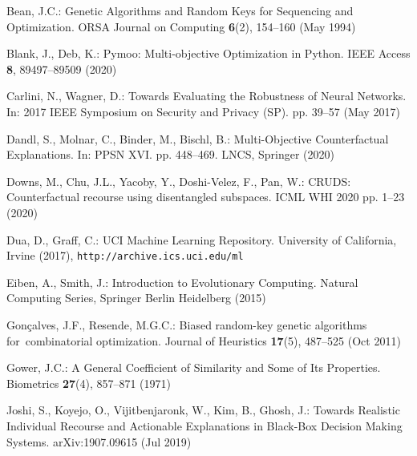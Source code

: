 \documentclass[runningheads, envcountsame, a4paper]{llncs}
\begin{document}
\begin{thebibliography}{10}
\providecommand{\url}[1]{\texttt{#1}}
\providecommand{\urlprefix}{URL }
\providecommand{\doi}[1]{https://doi.org/#1}

Bean, J.C.: Genetic {{Algorithms}} and {{Random Keys}} for {{Sequencing}} and
  {{Optimization}}. {ORSA} Journal on Computing  \textbf{6}(2),  154--160 (May
  1994)

Blank, J., Deb, K.: Pymoo: {{Multi}}-objective {{Optimization}} in {{Python}}.
  IEEE Access  \textbf{8},  89497--89509 (2020)

Carlini, N., Wagner, D.: Towards {{Evaluating}} the {{Robustness}} of {{Neural
  Networks}}. In: 2017 {{IEEE Symposium}} on {{Security}} and {{Privacy}}
  ({{SP}}). pp. 39--57 (May 2017)

Dandl, S., Molnar, C., Binder, M., Bischl, B.: Multi-{{Objective Counterfactual
  Explanations}}. In: {PPSN XVI}. pp. 448--469. {LNCS}, {Springer} (2020)

Downs, M., Chu, J.L., Yacoby, Y., {Doshi-Velez}, F., Pan, W.: {{CRUDS}}:
  {{Counterfactual}} recourse using disentangled subspaces. ICML WHI 2020 pp.
  1--23 (2020)

Dua, D., Graff, C.: {{UCI Machine Learning Repository}}. University of
  California, Irvine (2017), \url{http://archive.ics.uci.edu/ml}

Eiben, A., Smith, J.: Introduction to {{Evolutionary Computing}}. Natural
  {{Computing Series}}, {Springer Berlin Heidelberg} (2015)

Gon{\c c}alves, J.F., Resende, M.G.C.: Biased random-key genetic algorithms
  for~combinatorial optimization. Journal of Heuristics  \textbf{17}(5),
  487--525 (Oct 2011)

Gower, J.C.: A {{General Coefficient}} of {{Similarity}} and {{Some}} of {{Its
  Properties}}. Biometrics  \textbf{27}(4),  857--871 (1971)

Joshi, S., Koyejo, O., Vijitbenjaronk, W., Kim, B., Ghosh, J.: Towards
  {{Realistic Individual Recourse}} and {{Actionable Explanations}} in
  {{Black}}-{{Box Decision Making Systems}}. arXiv:1907.09615  (Jul 2019)


\end{thebibliography}
\end{document}
